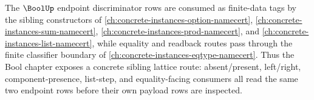 \begin{proposition}
\label{prop:bool-finite-data-dependency-lattice}
The $\BoolUp$ endpoint discriminator rows are consumed as finite-data tags by the sibling constructors of \autoref{ch:concrete-instances-option-namecert}, \autoref{ch:concrete-instances-sum-namecert}, \autoref{ch:concrete-instances-prod-namecert}, and \autoref{ch:concrete-instances-list-namecert}, while equality and readback routes pass through the finite classifier boundary of \autoref{ch:concrete-instances-eqtype-namecert}. Thus the Bool chapter exposes a concrete sibling lattice route: absent/present, left/right, component-presence, list-step, and equality-facing consumers all read the same two endpoint rows before their own payload rows are inspected.
\end{proposition}

